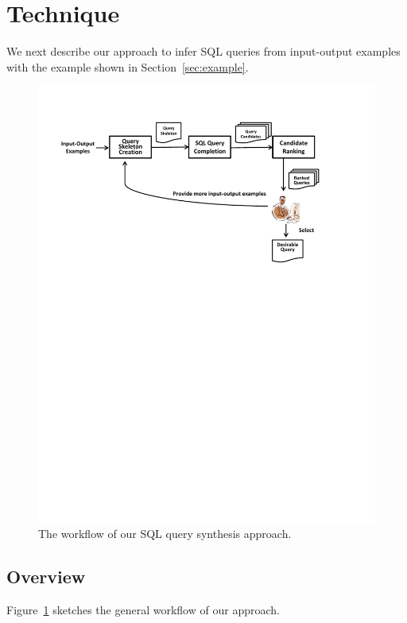 
\section{Technique}
\label{sec:approach}



We next describe our approach to infer SQL queries from 
input-output examples with the example shown 
in Section~\ref{sec:example}. 

\begin{figure}[t]
  \centering
  \includegraphics[scale=0.53]{workflow}
  \vspace*{-5.0ex}\caption {{\label{fig:workflow} The workflow of our SQL query synthesis approach.
}}

\end{figure}

\subsection{Overview}
Figure~\ref{fig:workflow} sketches the general workflow of our approach.

